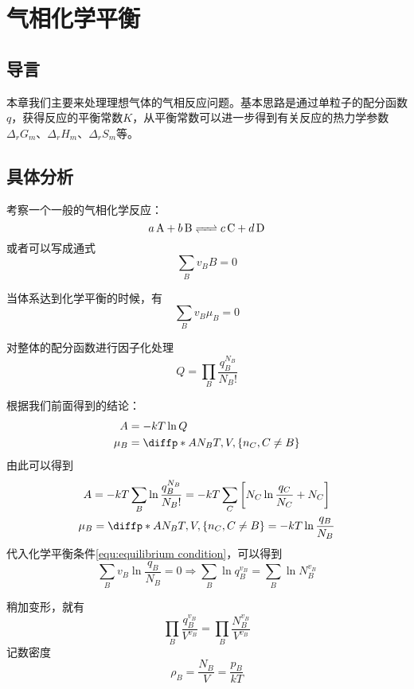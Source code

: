 \chapter{气相化学平衡} %
\label{cha:气相化学平衡}
\section{导言} %
\label{sec:导言 9}
本章我们主要来处理理想气体的气相反应问题。基本思路是通过单粒子的配分函数$q$，获得反应的平衡常数$K$，从平衡常数可以进一步得到有关反应的热力学参数$\Delta_r G_m$、$\Delta_r H_m$、$\Delta_r S_m$等。
\section{具体分析} %
\label{sec:具体分析}
考察一个一般的气相化学反应：
\begin{equation*}
    \ce{a A + b B <=> c C + d D}
\end{equation*}
或者可以写成通式\begin{equation*}
    \sum_B v_B B =0
\end{equation*}

当体系达到化学平衡的时候，有\begin{equation}
    \sum_Bv_B \mu_B=0 \label{equ:equilibrium condition}
\end{equation}

对整体的配分函数进行因子化处理\begin{equation*}
    Q=\prod_B \frac{q_B^{N_B}}{N_B!}
\end{equation*}

根据我们前面得到的结论：\begin{align}
    A&=-kT \ln Q\\
    \mu_B &=\diffp*{A}{{N_B}}{T,V,\{n_C,C\neq B\}}
\end{align}
由此可以得到\begin{gather}
    A=-kT \sum_B \ln \frac{q_B^{N_B}}{N_B!}=-kT \sum_C \left[N_C\ln\frac{q_C}{N_C}+N_C\right]\\
    \mu_B =\diffp*{A}{{N_B}}{T,V,\{n_C,C\neq B\}}=-kT \ln \frac{q_B}{N_B}
\end{gather}
代入化学平衡条件\eqref{equ:equilibrium condition}，可以得到\begin{equation}
    \sum_B v_B \ln \frac{q_B}{N_B}=0\Rightarrow \sum_B \ln q_B^{v_B} =\sum_B \ln N_B^{v_B}
\end{equation}

稍加变形，就有\begin{equation}
    \prod_B \frac{q_B^{v_B}}{V^{v_B}}=\prod_B \frac{N_B^{v_B}}{V^{v_B}}
\end{equation}
记数密度\begin{equation}
    \rho_B = \frac{N_B}{V}=\frac{p_B}{kT}
\end{equation}

